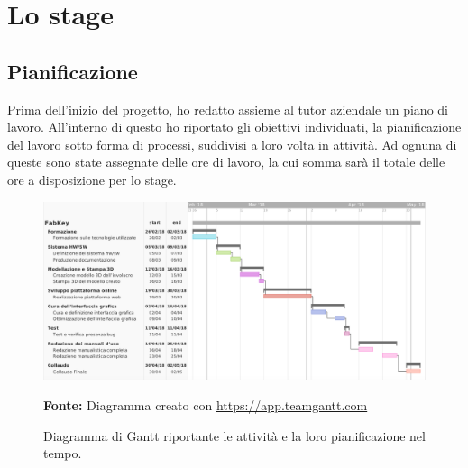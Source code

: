 
\chapter{Lo stage}
\label{cap:descrizione-stage}

\section{Pianificazione}
Prima dell'inizio del progetto, ho redatto assieme al tutor aziendale un piano di lavoro. All'interno di questo ho riportato gli obiettivi individuati, la pianificazione del lavoro sotto forma di processi, suddivisi a loro volta in attività. Ad ognuna di queste sono state assegnate delle ore di lavoro, la cui somma sarà il totale delle ore a disposizione per lo stage.

\bigskip

\begin{figure}[H]
	\begin{center}
	\includegraphics[scale=0.35]{immagini/gantt_best.png}
	\caption{Diagramma di Gantt riportante le attività e la loro pianificazione nel tempo.}
	\small{\textbf{Fonte:} Diagramma creato con \url{https://app.teamgantt.com}}
	\end{center}
\end{figure}

